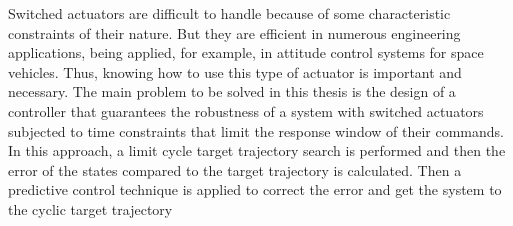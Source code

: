 Switched actuators are difficult to handle because of some characteristic constraints of their nature. 
But they are efficient in numerous engineering applications, being applied, for example, in attitude control systems for space vehicles. 
Thus, knowing how to use this type of actuator is important and necessary. 
The main problem to be solved in this thesis is the design of a controller that guarantees the robustness of a system with switched actuators subjected to time constraints 
that limit the response window of their commands.
In this approach, a limit cycle target trajectory search is performed and then the error of the states compared to the target trajectory is calculated. Then a predictive control technique 
is applied to correct the error and get the system to the cyclic target trajectory
